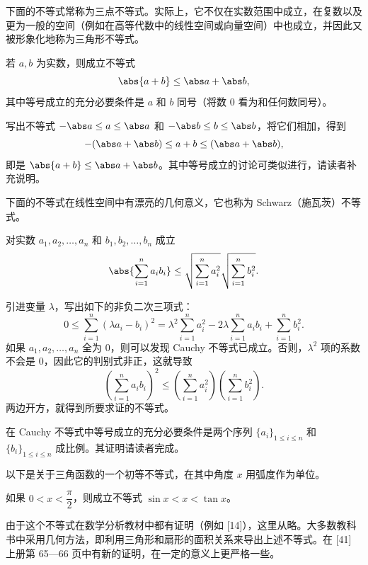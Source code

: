 下面的不等式常称为三点不等式。实际上，它不仅在实数范围中成立，在复数以及更为一般的空间（例如在高等代数中的线性空间或向量空间）中也成立，并因此又被形象化地称为三角形不等式。

\begin{xproposition}[1.3.4（三点不等式）]
若 $a,b$ 为实数，则成立不等式
\[
  \abs{a+b}\le \abs a+\abs b,
\]
其中等号成立的充分必要条件是 $a$ 和 $b$ 同号（将数 $0$ 看为和任何数同号）。
\end{xproposition}

\begin{xproof}
写出不等式 $-\abs a\le a\le\abs a$ 和 $-\abs b\le b\le\abs b$，将它们相加，得到
\[
  -(\abs a+\abs b)\le a+b\le (\abs a+\abs b),
\]
即是 $\abs{a+b}\le\abs a+\abs b$。其中等号成立的讨论可类似进行，请读者补充说明。
\end{xproof}

下面的不等式在线性空间中有漂亮的几何意义，它也称为 Schwarz（施瓦茨）不等式。

\begin{xproposition}
对实数 $a_1,a_2,\ldots,a_n$ 和 $b_1,b_2,\ldots,b_n$ 成立
\[
  \abs{\sum_{i=1}^n a_i b_i}
  \le
  \sqrt{\sum_{i=1}^n a_i^2}\sqrt{\sum_{i=1}^n b_i^2}.
\]
\end{xproposition}

\begin{xproof}
引进变量 $\lambda$，写出如下的非负二次三项式：
\[
  0\le\sum_{i=1}^n(\lambda a_i-b_i)^2
  =\lambda^2\sum_{i=1}^n a_i^2
  -2\lambda\sum_{i=1}^n a_i b_i
  +\sum_{i=1}^n b_i^2.
\]
如果 $a_1,a_2,\ldots,a_n$ 全为 $0$，则可以发现 Cauchy 不等式已成立。否则，$\lambda^2$ 项的系数不会是 $0$，因此它的判别式非正，这就导致
\[
  \left(\sum_{i=1}^n a_i b_i\right)^2
  \le
  \left(\sum_{i=1}^n a_i^2\right)
  \left(\sum_{i=1}^n b_i^2\right).
\]
两边开方，就得到所要求证的不等式。
\end{xproof}

\begin{xremark}
在 Cauchy 不等式中等号成立的充分必要条件是两个序列 $\{a_i\}_{1\le i\le n}$ 和 $\{b_i\}_{1\le i\le n}$ 成比例。其证明请读者完成。
\end{xremark}

以下是关于三角函数的一个初等不等式，在其中角度 $x$ 用弧度作为单位。

\begin{xproposition}[1.3.6]
如果 $0<x<\dfrac\pi2$，则成立不等式 $\sin x<x<\tan x$。
\end{xproposition}

\begin{xremark}
由于这个不等式在数学分析教材中都有证明（例如 [14]），这里从略。大多数教科书中采用几何方法，即利用三角形和扇形的面积关系来导出上述不等式。在 [41] 上册第 65—66 页中有新的证明，在一定的意义上更严格一些。
\end{xremark}

